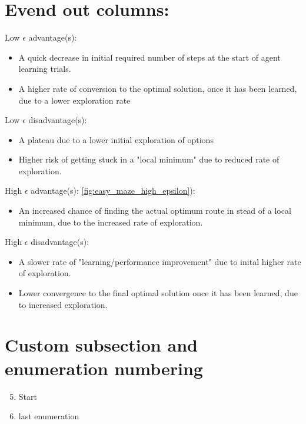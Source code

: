 \section{Evend out columns:}
\begin{multicols}{2}
\noindent Low $\epsilon$ advantage(s): 
    \begin{itemize}
        \item A quick decrease in initial required number of steps at the start of agent learning trials.
        \item A higher rate of conversion to the optimal solution, once it has been learned, due to a lower exploration rate
    \end{itemize}
\noindent Low $\epsilon$ disadvantage(s):
\begin{itemize}
    \item A plateau due to a lower initial exploration of options
    \item Higher risk of getting stuck in a "local minimum" due to reduced rate of exploration.
\end{itemize}
\columnbreak
High $\epsilon$ advantage(s): 
\cref{fig:easy_maze_high_epsilon}):
    \begin{itemize}
        \setcounter{enumi}{2}
        \item An increased chance of finding the actual optimum route in stead of a local minimum, due to the increased rate of exploration.
    \end{itemize}
\bigskip
\bigskip
\bigskip
\bigskip
\bigskip
\bigskip
\bigskip
\bigskip
\noindent High $\epsilon$ disadvantage(s): 
\begin{itemize}
    \item A slower rate of "learning/performance improvement" due to inital higher rate of exploration.
    \item Lower convergence to the final optimal solution once it has been learned, due to increased exploration.
\end{itemize}
\end{multicols}

\setcounter{section}{1} 
\setcounter{subsection}{1}
\section{Custom subsection and enumeration numbering}
\begin{enumerate}
    \setcounter{enumi}{4} 
    \item Start
    \item last enumeration
\end{enumerate}

